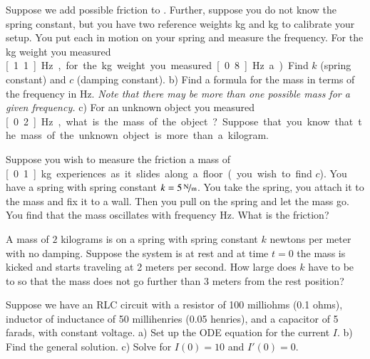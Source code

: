 \documentclass[12pt]{book}
\begin{document}
\begin{exercise}
Suppose we add possible friction to .
Further, suppose you do not know the spring constant, but you have
two reference weights \unit[1]{kg} and \unit[2]{kg} to calibrate your setup.
You put each in motion on your spring and measure the
frequency.  For the \unit[1]{kg}
weight you measured \unit[1.1]{Hz}, for the \unit[2]{kg} weight you
measured \unit[0.8]{Hz}.  a) Find $k$ (spring constant) and $c$ (damping constant).
b) Find a formula for the mass in terms of the frequency in Hz.  \emph{Note that
there may be more than one possible mass for a given frequency.}
c) For an unknown object you measured \unit[0.2]{Hz}, what is the mass of the
object?  Suppose that you know that the mass of the unknown object
is more than a kilogram.
\end{exercise}

\begin{exercise}
Suppose you wish to measure the friction a mass of \unit[0.1]{kg} experiences
as it slides along a floor (you wish to find $c$).  You have a spring with
spring constant $k=\unitfrac[5]{N}{m}$.  You take the spring, you attach it
to the mass and fix it to a wall.  Then you pull on the spring and let the
mass go.  You find that the mass oscillates with frequency \unit[1]{Hz}.
What is the friction?
\end{exercise}

\setcounter{exercise}{100}

\begin{exercise}
A mass of $2$ kilograms is on a spring with spring constant $k$ newtons per
meter with no damping.  Suppose the system is at rest and at time $t=0$ the
mass is kicked and starts traveling at 2 meters per second.  How large
does $k$ have to be to so that the mass does not go further than 3 meters
from the rest position?
\end{exercise}

\begin{exercise}
Suppose we have an RLC circuit with a resistor of 100 milliohms (0.1 ohms),
inductor of inductance of 50 millihenries (0.05 henries), and a capacitor of 5 farads, with
constant voltage.  a) Set up the ODE equation for the current $I$. b) Find
the general solution.  c) Solve for $I(0) = 10$ and $I'(0) = 0$.
\end{exercise}
\end{document}
